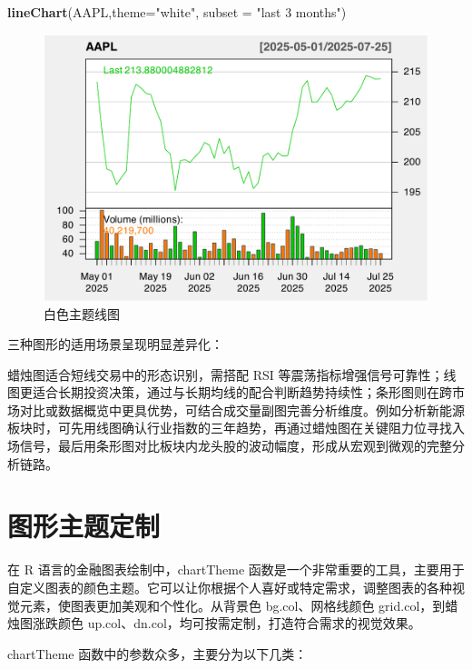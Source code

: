 \documentclass[]{ctexbook}
\newenvironment{Shaded}{\begin{snugshade}}{\end{snugshade}}
\newcommand{\AttributeTok}[1]{\textcolor[rgb]{0.13,0.29,0.53}{#1}}
\newcommand{\FunctionTok}[1]{\textcolor[rgb]{0.13,0.29,0.53}{\textbf{#1}}}
\newcommand{\NormalTok}[1]{#1}
\newcommand{\StringTok}[1]{\textcolor[rgb]{0.31,0.60,0.02}{#1}}
\begin{document}
\begin{Shaded}
\begin{Highlighting}[]
\FunctionTok{lineChart}\NormalTok{(AAPL,}\AttributeTok{theme=}\StringTok{"white"}\NormalTok{, }\AttributeTok{subset =} \StringTok{"last 3 months"}\NormalTok{)}
\end{Highlighting}
\end{Shaded}

\begin{figure}
\includegraphics[width=0.9\linewidth]{QuantmodHandbook_files/figure-latex/lineWhite-1} \caption{白色主题线图}\label{fig:lineWhite}
\end{figure}

三种图形的适用场景呈现明显差异化：

蜡烛图适合短线交易中的形态识别，需搭配 RSI 等震荡指标增强信号可靠性；线图更适合长期投资决策，通过与长期均线的配合判断趋势持续性；条形图则在跨市场对比或数据概览中更具优势，可结合成交量副图完善分析维度。例如分析新能源板块时，可先用线图确认行业指数的三年趋势，再通过蜡烛图在关键阻力位寻找入场信号，最后用条形图对比板块内龙头股的波动幅度，形成从宏观到微观的完整分析链路。

\section{图形主题定制}\label{ux56feux5f62ux4e3bux9898ux5b9aux5236}

在 R 语言的金融图表绘制中，chartTheme 函数是一个非常重要的工具，主要用于自定义图表的颜色主题。它可以让你根据个人喜好或特定需求，调整图表的各种视觉元素，使图表更加美观和个性化。从背景色 bg.col、网格线颜色 grid.col，到蜡烛图涨跌颜色 up.col、dn.col，均可按需定制，打造符合需求的视觉效果。

chartTheme 函数中的参数众多，主要分为以下几类：
\end{document}
